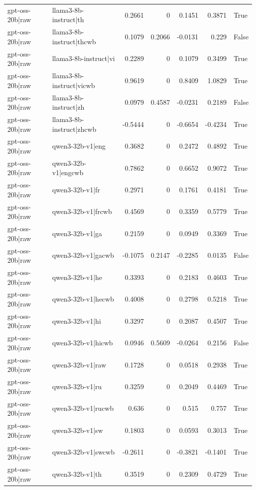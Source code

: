 \begin{table}
\begin{tabular}{l l r r r r l}
gpt-oss-20b|raw & llama3-8b-instruct|th & 0.2661 & 0 & 0.1451 & 0.3871 & True \\
gpt-oss-20b|raw & llama3-8b-instruct|thcwb & 0.1079 & 0.2066 & -0.0131 & 0.229 & False \\
gpt-oss-20b|raw & llama3-8b-instruct|vi & 0.2289 & 0 & 0.1079 & 0.3499 & True \\
gpt-oss-20b|raw & llama3-8b-instruct|vicwb & 0.9619 & 0 & 0.8409 & 1.0829 & True \\
gpt-oss-20b|raw & llama3-8b-instruct|zh & 0.0979 & 0.4587 & -0.0231 & 0.2189 & False \\
gpt-oss-20b|raw & llama3-8b-instruct|zhcwb & -0.5444 & 0 & -0.6654 & -0.4234 & True \\
gpt-oss-20b|raw & qwen3-32b-v1|eng & 0.3682 & 0 & 0.2472 & 0.4892 & True \\
gpt-oss-20b|raw & qwen3-32b-v1|engcwb & 0.7862 & 0 & 0.6652 & 0.9072 & True \\
gpt-oss-20b|raw & qwen3-32b-v1|fr & 0.2971 & 0 & 0.1761 & 0.4181 & True \\
gpt-oss-20b|raw & qwen3-32b-v1|frcwb & 0.4569 & 0 & 0.3359 & 0.5779 & True \\
gpt-oss-20b|raw & qwen3-32b-v1|ga & 0.2159 & 0 & 0.0949 & 0.3369 & True \\
gpt-oss-20b|raw & qwen3-32b-v1|gacwb & -0.1075 & 0.2147 & -0.2285 & 0.0135 & False \\
gpt-oss-20b|raw & qwen3-32b-v1|he & 0.3393 & 0 & 0.2183 & 0.4603 & True \\
gpt-oss-20b|raw & qwen3-32b-v1|hecwb & 0.4008 & 0 & 0.2798 & 0.5218 & True \\
gpt-oss-20b|raw & qwen3-32b-v1|hi & 0.3297 & 0 & 0.2087 & 0.4507 & True \\
gpt-oss-20b|raw & qwen3-32b-v1|hicwb & 0.0946 & 0.5609 & -0.0264 & 0.2156 & False \\
gpt-oss-20b|raw & qwen3-32b-v1|raw & 0.1728 & 0 & 0.0518 & 0.2938 & True \\
gpt-oss-20b|raw & qwen3-32b-v1|ru & 0.3259 & 0 & 0.2049 & 0.4469 & True \\
gpt-oss-20b|raw & qwen3-32b-v1|rucwb & 0.636 & 0 & 0.515 & 0.757 & True \\
gpt-oss-20b|raw & qwen3-32b-v1|sw & 0.1803 & 0 & 0.0593 & 0.3013 & True \\
gpt-oss-20b|raw & qwen3-32b-v1|swcwb & -0.2611 & 0 & -0.3821 & -0.1401 & True \\
gpt-oss-20b|raw & qwen3-32b-v1|th & 0.3519 & 0 & 0.2309 & 0.4729 & True \\

\end{tabular}
\end{table}
